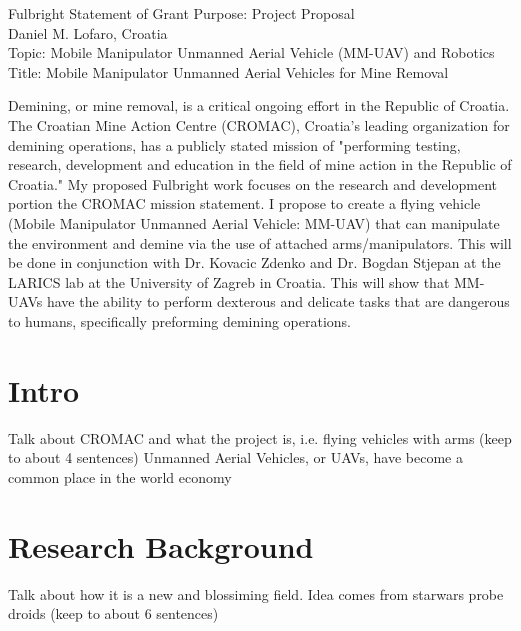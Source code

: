 \documentclass[12pt]{article}
\begin{document}
\begin{center}
\Large
Fulbright Statement of Grant Purpose: Project Proposal\\
\large
Daniel M. Lofaro, Croatia\\
Topic: Mobile Manipulator Unmanned Aerial Vehicle (MM-UAV) and Robotics\\
Title: Mobile Manipulator Unmanned Aerial Vehicles for Mine Removal\\

\end{center}

\normalsize
Demining, or mine removal, is a critical ongoing effort in the Republic of Croatia.  The Croatian Mine 
Action Centre (CROMAC), Croatia's leading organization for demining operations, has a publicly stated 
mission of "performing testing, research, development and education in the field of mine action in the 
Republic of Croatia."  My proposed Fulbright work focuses on the research and development portion 
the CROMAC mission statement.  I propose to create a flying vehicle (Mobile Manipulator Unmanned 
Aerial Vehicle: MM-UAV) that can manipulate the environment and demine via the use of attached 
arms/manipulators.  This will be done in conjunction with Dr. Kovacic Zdenko and Dr. Bogdan Stjepan 
at the LARICS lab at the University of Zagreb in Croatia.  This will show that MM-UAVs have the ability 
to perform dexterous and delicate tasks that are dangerous to humans, specifically preforming 
demining operations.

\section{Intro}
Talk about CROMAC and what the project is, i.e. flying vehicles with arms (keep to about 4 sentences)
Unmanned Aerial Vehicles, or UAVs, have become a common place in the world economy


\section{Research Background}
Talk about how it is a new and blossiming field.  Idea comes from starwars probe droids (keep to about 
6 sentences)
\end{document}
